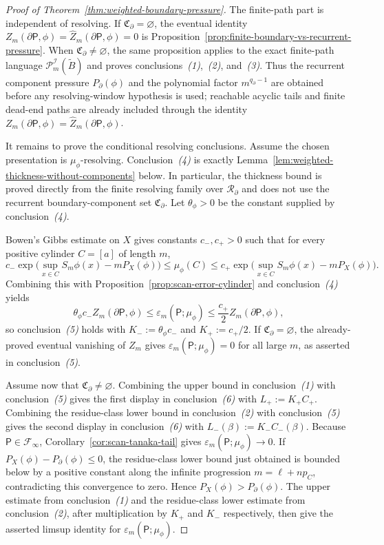 \documentclass{etds}%
\numberwithin{equation}{section}
\theoremstyle{plain}
\theoremstyle{definition}
\theoremstyle{remark}
\begin{document}
\begin{proof}[Proof of Theorem~\ref{thm:weighted-boundary-pressure}]
The finite-path part is independent of resolving.  If
$\mathfrak{C}_\partial=\varnothing$, the eventual identity
$Z_m(\partial\mathsf{P},\phi)=\widehat Z_m(\partial\mathsf{P},\phi)=0$ is
Proposition~\ref{prop:finite-boundary-vs-recurrent-pressure}.  When
$\mathfrak{C}_\partial\neq\varnothing$, the same proposition applies to the
exact finite-path language
$\mathcal{P}_m^{\mathcal{I}}(\widetilde B)$ and proves
conclusions~\emph{(1)},~\emph{(2)}, and~\emph{(3)}.  Thus the recurrent
component pressure $P_\partial(\phi)$ and the polynomial factor
$m^{q_\partial-1}$ are obtained before any resolving-window hypothesis is
used; reachable acyclic tails and finite dead-end paths are already included
through the identity
$Z_m(\partial\mathsf{P},\phi)=\widehat Z_m(\partial\mathsf{P},\phi)$.

It remains to prove the conditional resolving conclusions.  Assume the chosen
presentation is $\mu_\phi$-resolving.  Conclusion~\emph{(4)} is exactly
Lemma~\ref{lem:weighted-thickness-without-components} below.  In particular,
the thickness bound is proved directly from the finite resolving family over
$\mathcal{R}_\partial$ and does not use the recurrent boundary-component set
$\mathfrak{C}_\partial$.  Let $\theta_\phi>0$ be the constant supplied by
conclusion~\emph{(4)}.

Bowen's Gibbs estimate on $X$ \cite{Bowen1975,WaltersErgodicTheory} gives
constants $c_-,c_+>0$ such that for every positive cylinder $C=[a]$ of length
$m$,
\[
c_-\exp\!\bigl(\sup_{x\in C}S_m\phi(x)-mP_X(\phi)\bigr)
\le \mu_\phi(C)
\le
c_+\exp\!\bigl(\sup_{x\in C}S_m\phi(x)-mP_X(\phi)\bigr).
\]
Combining this with Proposition~\ref{prop:scan-error-cylinder} and
conclusion~\emph{(4)}
yields
\[
\theta_\phi c_- Z_m(\partial\mathsf{P},\phi)
\le \varepsilon_m(\mathsf{P};\mu_\phi)
\le \frac{c_+}{2}Z_m(\partial\mathsf{P},\phi),
\]
so conclusion~\emph{(5)} holds with $K_-:=\theta_\phi c_-$ and
$K_+:=c_+/2$.  If $\mathfrak{C}_\partial=\varnothing$, the already-proved
eventual vanishing of $Z_m$ gives
$\varepsilon_m(\mathsf{P};\mu_\phi)=0$ for all large $m$, as asserted in
conclusion~\emph{(5)}.

Assume now that $\mathfrak{C}_\partial\neq\varnothing$.  Combining the upper
bound in conclusion~\emph{(1)} with conclusion~\emph{(5)} gives the first
display in conclusion~\emph{(6)} with $L_+:=K_+C_+$.  Combining the
residue-class lower bound in conclusion~\emph{(2)} with conclusion~\emph{(5)}
gives the second display in conclusion~\emph{(6)} with
$L_-(\beta):=K_-C_-(\beta)$.
Because $\mathsf{P}\in\mathcal{F}_\infty$,
Corollary~\ref{cor:scan-tanaka-tail} gives
$\varepsilon_m(\mathsf{P};\mu_\phi)\to0$.  If
$P_X(\phi)-P_\partial(\phi)\le0$, the residue-class lower bound just obtained
is bounded below by a positive constant along the infinite progression
$m=\ell+np_C$, contradicting this convergence to zero.  Hence
$P_X(\phi)>P_\partial(\phi)$.  The upper estimate from conclusion~\emph{(1)}
and the residue-class lower estimate from conclusion~\emph{(2)}, after multiplication by
$K_+$ and $K_-$ respectively, then give the asserted limsup identity for
$\varepsilon_m(\mathsf{P};\mu_\phi)$.


\end{proof}
\end{document}
